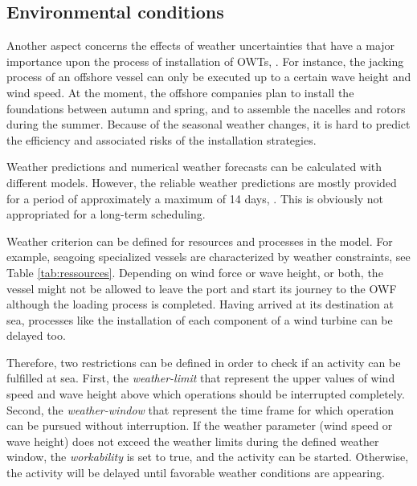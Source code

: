 \subsection{Environmental conditions}
Another aspect concerns the effects of weather uncertainties that have a major importance upon the process of installation of OWTs, \cite{COMPIT11}. For instance, the jacking process of an offshore vessel can only be executed up to a certain wave height and wind speed. At the moment, the offshore companies plan to install the foundations between autumn and spring, and to assemble the nacelles and rotors during the summer. Because of the seasonal weather changes, it is hard to predict the efficiency and associated risks of the installation strategies.

Weather predictions and numerical weather forecasts can be calculated with different models. However, the reliable weather predictions are mostly provided for a period of approximately a maximum of 14 days, \cite{Hinnenthal_2010}. This is obviously not appropriated for a long-term scheduling.

Weather criterion can be defined for resources and processes in the model. For example, seagoing specialized vessels are characterized by weather constraints, see Table \ref{tab:ressources}. Depending on wind force or wave height, or both, the vessel might not be allowed to leave the port and start its journey to the OWF although the loading process is completed. Having arrived at its destination at sea, processes like the installation of each component of a wind turbine can be delayed too.

Therefore, two restrictions can be defined in order to check if an activity can be fulfilled at sea. First, the \textit{weather-limit} that represent the upper values of wind speed and wave height above which operations should be interrupted completely. Second, the \textit{weather-window} that represent the time frame for which operation can be pursued without interruption.  If the weather parameter (wind speed or wave height) does not exceed the weather limits during the defined weather window, the \textit{workability} is set to true, and the activity can be started. Otherwise, the activity will be delayed until favorable weather conditions are appearing.

